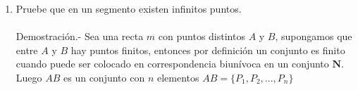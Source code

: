 \documentclass[10pt]{article}
\begin{document}
\begin{enumerate}
\begin{enumerate}[\bfseries (a)]
	\end{enumerate}

    \item Pruebe que en un segmento existen infinitos puntos.\\\\
    Demostración.-\; Sea una recta $m$ con puntos distintos $A$ y $B$, supongamos que entre $A$ y $B$ hay puntos finitos, entonces por definición un conjunto es finito cuando puede ser colocado en correspondencia biunívoca en un conjunto $\mathbf{N}$. Luego $AB$ es un conjunto con $n$ elementos $AB=\lbrace P_1,P_2,...,P_n \rbrace$\\\\


\end{enumerate}
\end{document}
